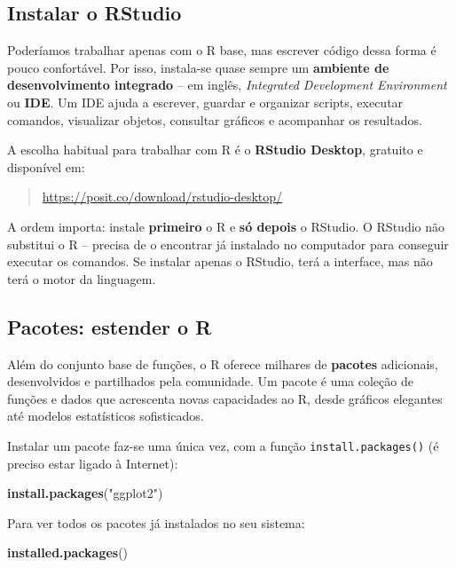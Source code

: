 \documentclass[
  portuguese,
  11pt,
  openany]{book}
\newenvironment{Shaded}{\begin{snugshade}}{\end{snugshade}}
\newcommand{\FunctionTok}[1]{\textcolor[rgb]{0.13,0.29,0.53}{\textbf{#1}}}
\newcommand{\NormalTok}[1]{#1}
\newcommand{\StringTok}[1]{\textcolor[rgb]{0.31,0.60,0.02}{#1}}
\begin{document}
\subsection{Instalar o RStudio}\label{instalar-o-rstudio}

Poderíamos trabalhar apenas com o R base, mas escrever código dessa forma é pouco confortável. Por isso, instala-se quase sempre um \textbf{ambiente de desenvolvimento integrado} -- em inglês, \emph{Integrated Development Environment} ou \textbf{IDE}. Um IDE ajuda a escrever, guardar e organizar scripts, executar comandos, visualizar objetos, consultar gráficos e acompanhar os resultados.

A escolha habitual para trabalhar com R é o \textbf{RStudio Desktop}, gratuito e disponível em:

\begin{quote}
\url{https://posit.co/download/rstudio-desktop/}
\end{quote}

A ordem importa: instale \textbf{primeiro} o R e \textbf{só depois} o RStudio. O RStudio não substitui o R -- precisa de o encontrar já instalado no computador para conseguir executar os comandos. Se instalar apenas o RStudio, terá a interface, mas não terá o motor da linguagem.

\subsection{Pacotes: estender o R}\label{pacotes-estender-o-r}

Além do conjunto base de funções, o R oferece milhares de \textbf{pacotes} adicionais,
desenvolvidos e partilhados pela comunidade. Um pacote é uma coleção de funções e
dados que acrescenta novas capacidades ao R, desde gráficos elegantes até
modelos estatísticos sofisticados.

Instalar um pacote faz-se uma única vez, com a função \texttt{install.packages()}
(é preciso estar ligado à Internet):

\begin{Shaded}
\begin{Highlighting}[]
\FunctionTok{install.packages}\NormalTok{(}\StringTok{"ggplot2"}\NormalTok{)}
\end{Highlighting}
\end{Shaded}

Para ver todos os pacotes já instalados no seu sistema:

\begin{Shaded}
\begin{Highlighting}[]
\FunctionTok{installed.packages}\NormalTok{()}
\end{Highlighting}
\end{Shaded}
\end{document}
